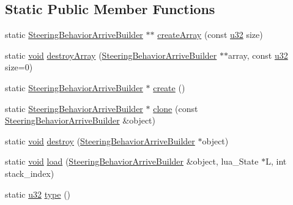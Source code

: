 \subsection*{Static Public Member Functions}
\begin{DoxyCompactItemize}
\item 
static \mbox{\hyperlink{classnjli_1_1_steering_behavior_arrive_builder}{Steering\+Behavior\+Arrive\+Builder}} $\ast$$\ast$ \mbox{\hyperlink{classnjli_1_1_steering_behavior_arrive_builder_a1e1038411d15323c3bc9e23d6aefe0c0}{create\+Array}} (const \mbox{\hyperlink{_util_8h_a10e94b422ef0c20dcdec20d31a1f5049}{u32}} size)
\item 
static \mbox{\hyperlink{_thread_8h_af1e856da2e658414cb2456cb6f7ebc66}{void}} \mbox{\hyperlink{classnjli_1_1_steering_behavior_arrive_builder_aeec33257b37c71fd3cb7042c534f1ff7}{destroy\+Array}} (\mbox{\hyperlink{classnjli_1_1_steering_behavior_arrive_builder}{Steering\+Behavior\+Arrive\+Builder}} $\ast$$\ast$array, const \mbox{\hyperlink{_util_8h_a10e94b422ef0c20dcdec20d31a1f5049}{u32}} size=0)
\item 
static \mbox{\hyperlink{classnjli_1_1_steering_behavior_arrive_builder}{Steering\+Behavior\+Arrive\+Builder}} $\ast$ \mbox{\hyperlink{classnjli_1_1_steering_behavior_arrive_builder_af00ed16ecc1b1bb202e3d787ad00c5c4}{create}} ()
\item 
static \mbox{\hyperlink{classnjli_1_1_steering_behavior_arrive_builder}{Steering\+Behavior\+Arrive\+Builder}} $\ast$ \mbox{\hyperlink{classnjli_1_1_steering_behavior_arrive_builder_ae7e3789fe4109faaa52ce84f2fcf6888}{clone}} (const \mbox{\hyperlink{classnjli_1_1_steering_behavior_arrive_builder}{Steering\+Behavior\+Arrive\+Builder}} \&object)
\item 
static \mbox{\hyperlink{_thread_8h_af1e856da2e658414cb2456cb6f7ebc66}{void}} \mbox{\hyperlink{classnjli_1_1_steering_behavior_arrive_builder_ae0eb9b506082b8038336ee76ddc02d28}{destroy}} (\mbox{\hyperlink{classnjli_1_1_steering_behavior_arrive_builder}{Steering\+Behavior\+Arrive\+Builder}} $\ast$object)
\item 
static \mbox{\hyperlink{_thread_8h_af1e856da2e658414cb2456cb6f7ebc66}{void}} \mbox{\hyperlink{classnjli_1_1_steering_behavior_arrive_builder_a6c39f5d65b1d2a82eceafb8e48754e34}{load}} (\mbox{\hyperlink{classnjli_1_1_steering_behavior_arrive_builder}{Steering\+Behavior\+Arrive\+Builder}} \&object, lua\+\_\+\+State $\ast$L, int stack\+\_\+index)
\item 
static \mbox{\hyperlink{_util_8h_a10e94b422ef0c20dcdec20d31a1f5049}{u32}} \mbox{\hyperlink{classnjli_1_1_steering_behavior_arrive_builder_a0ec3d9504d8f29944baf9e3ec5b1929e}{type}} ()
\end{DoxyCompactItemize}
